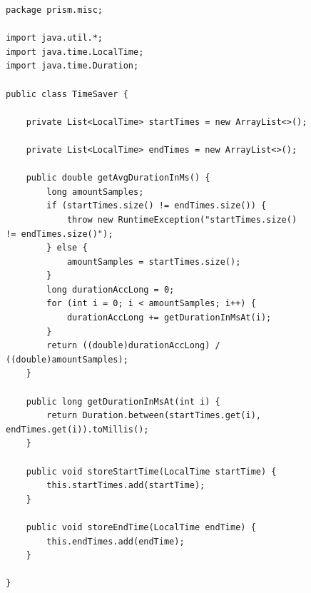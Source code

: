 \documentclass[preview]{standalone}
\begin{document}
\begin{figure}
\begin{lstlisting}[style=javaStyle, caption={TimeSaver.java}]		
package prism.misc;

import java.util.*;
import java.time.LocalTime;
import java.time.Duration;

public class TimeSaver {
	
	private List<LocalTime> startTimes = new ArrayList<>();
	
	private List<LocalTime> endTimes = new ArrayList<>();
	
	public double getAvgDurationInMs() {
		long amountSamples;
		if (startTimes.size() != endTimes.size()) {
			throw new RuntimeException("startTimes.size() != endTimes.size()");
		} else {
			amountSamples = startTimes.size();
		}
		long durationAccLong = 0;
		for (int i = 0; i < amountSamples; i++) {
			durationAccLong += getDurationInMsAt(i);
		}
		return ((double)durationAccLong) / ((double)amountSamples);
	}
	
	public long getDurationInMsAt(int i) {
		return Duration.between(startTimes.get(i), endTimes.get(i)).toMillis();
	}
	
	public void storeStartTime(LocalTime startTime) {
		this.startTimes.add(startTime);
	}
	
	public void storeEndTime(LocalTime endTime) {
		this.endTimes.add(endTime);
	}

}
\end{lstlisting}
\end{figure}
\end{document}
